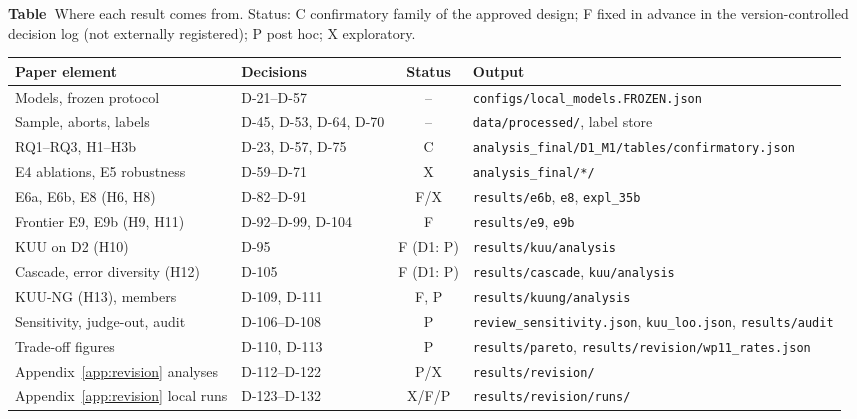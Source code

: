 \documentclass[pdflatex,iicol,sn-mathphys-num]{sn-jnl}
\begin{document}
\begin{appendices}
\par\medskip\noindent\begin{minipage}{\columnwidth}{\footnotesize{}\label{tab:trace}\textbf{Table~\thetable}\enspace Where each result comes from. Status: C confirmatory family of the approved design; F fixed in advance in the version-controlled decision log (not externally registered); P post hoc; X exploratory.\par}\smallskip
{\noindent\scriptsize\setlength{\tabcolsep}{2.5pt}
\begin{tabularx}{\columnwidth}{@{}>{\raggedright\arraybackslash}p{2.35cm} >{\raggedright\arraybackslash}p{1.25cm} c >{\raggedright\arraybackslash}X@{}}
\toprule
Paper element & Decisions & Status & Output \\
\midrule
Models, frozen protocol & D-21--D-57 & -- & \texttt{configs/\allowbreak{}local\_\allowbreak{}models.FROZEN.json} \\
Sample, aborts, labels & D-45, D-53, D-64, D-70 & -- & \texttt{data/\allowbreak{}processed/\allowbreak{}}, label store \\
RQ1--RQ3, H1--H3b & D-23, D-57, D-75 & C & \texttt{analysis\_\allowbreak{}final/\allowbreak{}D1\_\allowbreak{}M1/\allowbreak{}tables/\allowbreak{}confirmatory.json} \\
E4 ablations, E5 robustness & D-59--D-71 & X & \texttt{analysis\_\allowbreak{}final/\allowbreak{}*/\allowbreak{}} \\
E6a, E6b, E8 (H6, H8) & D-82--D-91 & F/X & \texttt{results/\allowbreak{}e6b}, \texttt{e8}, \texttt{expl\_\allowbreak{}35b} \\
Frontier E9, E9b (H9, H11) & D-92--D-99, D-104 & F & \texttt{results/\allowbreak{}e9}, \texttt{e9b} \\
KUU on D2 (H10) & D-95 & F (D1: P) & \texttt{results/\allowbreak{}kuu/\allowbreak{}analysis} \\
Cascade, error diversity (H12) & D-105 & F (D1: P) & \texttt{results/\allowbreak{}cascade}, \texttt{kuu/\allowbreak{}analysis} \\
KUU-NG (H13), members & D-109, D-111 & F, P & \texttt{results/\allowbreak{}kuung/\allowbreak{}analysis} \\
Sensitivity, judge-out, audit & D-106--D-108 & P & \texttt{review\_\allowbreak{}sensitivity.json}, \texttt{kuu\_\allowbreak{}loo.json}, \texttt{results/\allowbreak{}audit} \\
Trade-off figures & D-110, D-113 & P & \texttt{results/\allowbreak{}pareto}, \texttt{results/\allowbreak{}revision/\allowbreak{}wp11\_\allowbreak{}rates.json} \\
Appendix~\ref{app:revision} analyses & D-112--D-122 & P/X & \texttt{results/\allowbreak{}revision/\allowbreak{}} \\
Appendix~\ref{app:revision} local runs & D-123--D-132 & X/F/P & \texttt{results/\allowbreak{}revision/\allowbreak{}runs/\allowbreak{}} \\
\bottomrule
\end{tabularx}
\par}\end{minipage}\par\medskip

\end{appendices}


\end{document}
